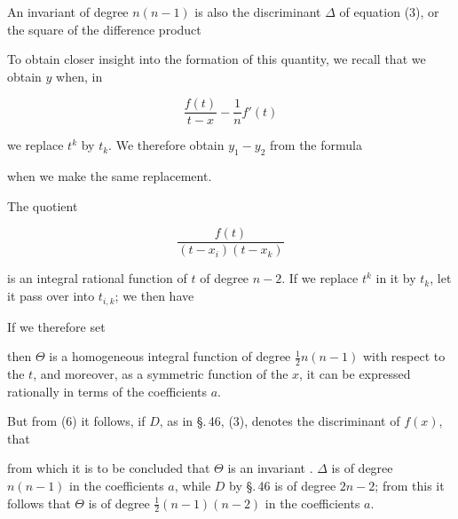 
An invariant of degree $n(n-1)$ is also the discriminant $\Delta$ of equation (3), or the square of the difference product


To obtain closer insight into the formation of this quantity, we recall that we obtain $y$ when, in

\[ \frac{f(t)}{t-x} - \frac{1}{n}f'(t) \]

we replace $t^k$ by $t_k$. We therefore obtain $y_1-y_2$ from the formula


when we make the same replacement.

The quotient

\[ \frac{f(t)}{(t-x_i)(t-x_k)} \]

is an integral rational function of $t$ of degree $n-2$. If we replace $t^k$ in it by $t_k$, let it pass over into $t_{i,k}$; we then have


If we therefore set


then $\Theta$ is a homogeneous integral function of degree $\frac{1}{2}n(n-1)$ with respect to the $t$, and moreover, as a symmetric function of the $x$, it can be expressed rationally in terms of the coefficients $a$.

But from (6) it follows, if $D$, as in \S.\,46, (3), denotes the discriminant of $f(x)$, that


from which it is to be concluded that $\Theta$ is an invariant . $\Delta$ is of degree $n(n-1)$ in the coefficients $a$, while $D$ by \S.\,46 is of degree $2n-2$; from this it follows that $\Theta$ is of degree $\frac{1}{2}(n-1)(n-2)$ in the coefficients $a$.
